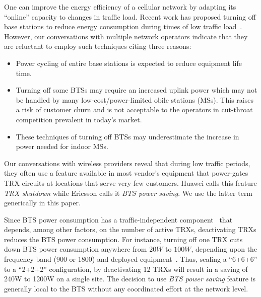 One can improve the energy efficiency of a cellular network by
adapting its ``online'' capacity to changes in traffic load.
Recent work has proposed turning off base stations to reduce
energy consumption during times of low traffic
load~\cite{Louhi:2007:BTSPower:INTELEC,Oh:Comm:2011,Peng:2011:BTSSaving:Mobicom,He:CellularPower:JN:2012}.
However, our conversations with multiple network operators
indicate that they are reluctant to employ such techniques
citing three reasons:
\begin{itemize}
\item Power cycling of entire base stations is expected to
    reduce equipment life time.
\item Turning off some BTSs may require an increased uplink
    power which may not be handled by many low-cost/power-limited obile
    stations (MSs). This raises a risk of customer churn and is
    not acceptable to the operators in cut-throat
    competition prevalent in today's market.
\item These techniques of turning off BTSs may
    underestimate the increase in power needed for indoor
    MSs.
\end{itemize}

Our conversations with
wireless providers reveal that during low traffic periods, they often use a feature available in most vendor's equipment that power-gates TRX circuits at locations that
serve very few customers. Huawei calls this feature \textit{TRX shutdown} while Ericsson calls it \textit{BTS power saving}. We use the latter term generically in this paper.

Since BTS power consumption has a traffic-independent
component~\cite{Peng:2011:BTSSaving:Mobicom} that depends,
among other factors, on the number of active TRXs, deactivating
TRXs reduces the BTS power consumption. For instance, turning
off one TRX cuts down BTS power consumption anywhere from $20W$
to $100W$, depending upon the frequency band (900 or 1800) and
deployed
equipment~\cite{Lorincz:BTS-Measure:Sensors:2012,flexibsc}.
Thus, scaling a ``6+6+6'' to a ``2+2+2'' configuration, by deactivating 12
TRXs will result in a saving of
240W to 1200W on a single site. The decision to use \textit{BTS
power saving} feature is generally local to the BTS without any
coordinated effort at the network level.

